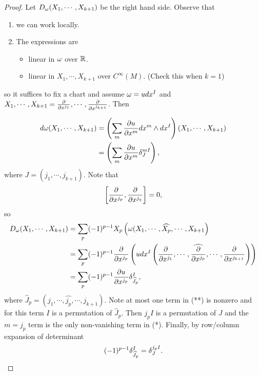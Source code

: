 \begin{proof}
    Let $D_\omega(X_1,\cdots,X_{k+1})$ be the right hand side. Observe that 
    \begin{enumerate}
    \item we can work locally.
    \item The expressions are 
    \begin{itemize}
        \item linear in $\omega$ over $\mathbb{R}$. 
        \item linear in $X_1,\cdots,X_{k+1}$ over $C^\infty(M)$. (Check this when $k=1$)
    \end{itemize}
    \end{enumerate}
    so it suffices to fix a chart and assume $\omega = udx^I$ and $ X_1,\cdots,X_{k+1} = \pdv{}{x^{j_1}}, \cdots, \pdv{}{x^{j_{k+1}}}$. Then 
    
    \begin{align*}
    d\omega(X_1,\cdots,X_{k+1})
    &= \left(
    \sum_m \pdv{u}{x^m} dx^m \wedge dx^I
    \right) (X_1,\cdots,X_{k+1}) \\
    &= \left(
    \sum_m \pdv{u}{x^m} \delta_J^{mI}
    \right),
    \end{align*}
    where $J = (j_1,\cdots,j_{k+1})$. Note that 
    $$\left[\pdv{}{x^{j_p}}, \pdv{}{x^{j_q}} \right]=0,$$
    so 
    \begin{align*}
    D_\omega(X_1,\cdots,X_{k+1})
    &= \sum_p (-1)^{p-1}X_{p}\left(
    \omega(X_1,\cdots,\widehat{X_p},\cdots,X_{k+1}
    \right) \\
    &= \sum_p(-1)^{p-1}\pdv{}{x^{j_p}}\left(
    udx^I \left(
    \pdv{}{x^{j_1}}, \cdots, \widehat{\pdv{}{x^{j_p}}},\cdots, \pdv{}{x^{j_{k+1}}} \right)
    \right) \\
    &= \sum_p (-1)^{p-1}\pdv{u}{x^{j_p}} \delta_{\widehat{J}_p}^I,
    \end{align*}
    where $\hat{J}_p = (j_1,\cdots,\hat{j_p},\cdots,j_{k+1})$.
    Note at most one term in (**) is nonzero and for this term $I$ is a permutation of $\hat{J}_p$. Then $j_pI$ is a permutation of $J$ and the $m=j_p$ term is the only non-vanishing term in (*). Finally, by row/column expansion of determinant 
    \begin{align*}
    (-1)^{p-1}\delta_{\widehat{J}_p}^I = \delta_J^{j_pI}. 
    \end{align*}
\end{proof}


